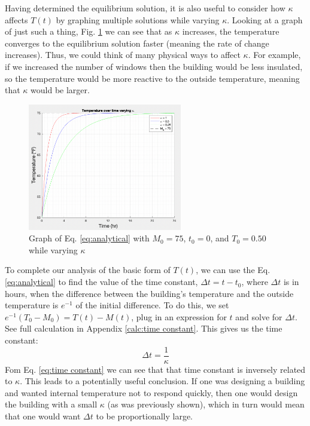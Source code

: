 \documentclass[titlepage]{article}
\begin{document}
Having determined the equilibrium solution, it is also useful to consider how $\kappa$
affects $T(t)$ by graphing multiple solutions while varying $\kappa$. Looking at a graph of just
such a thing, Fig. \ref{fig:kappa} we can see that as $\kappa$ increases, the temperature converges 
to the equilibrium solution faster (meaning the rate of change increases). Thus, we could think of many physical ways to affect 
$\kappa$. For example, if we increased the number of windows then the building would be less insulated, so the temperature
would be more reactive to the outside temperature, meaning that $\kappa$ would be larger.
\begin{figure}[H]
    \centering
    \includegraphics[width=0.6\textwidth]{./images/kappa.png}
    \caption{Graph of Eq. \eqref{eq:analytical} with $M_0=75$, $t_0=0$, and $T_0=0.50$ while varying $\kappa$}
    \label{fig:kappa}
\end{figure}

To complete our analysis of the basic form of $T(t)$, we can use the Eq. \eqref{eq:analytical} to find the value of the time constant, $\Delta t = t - t_0$, where $\Delta t$
is in hours, when the difference between the building's temperature and the outside temperature is $e^{-1}$ of the initial 
difference. To do this, we set $ e^{-1}(T_0-M_0) = T(t)-M(t)$, plug in an expression for $t$ and solve for $\Delta t$. See full calculation in
Appendix \ref{calc:time constant}. This gives us the time constant:
\begin{equation} \label{eq:time constant}
    \Delta t = \frac{1}{\kappa}
\end{equation}
Fom Eq. \eqref{eq:time constant}  we can see that that time constant is inversely related to $\kappa$. This leads to a potentially useful conclusion.
If one was designing a building and wanted internal temperature not to respond quickly, then one would
design the building with a small $\kappa$ (as was previously shown), which in turn would mean that
one would want $\Delta t$ to be proportionally large.
\end{document}
